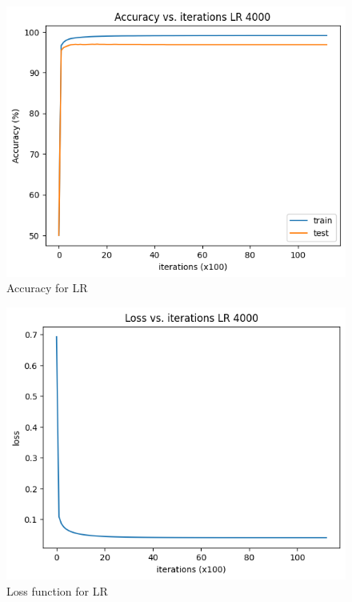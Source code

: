 \documentclass{article}
\begin{document}
\begin{multicols}{2}
    \begin{figure}[H]
        \centering
        \includegraphics[width=0.9\columnwidth]{Figures/ACC_lr_deep.png}
        \caption{\footnotesize Accuracy for LR}
        \label{fig:ACC_lr_deep}
    \end{figure}

    \begin{figure}[H]
        \centering
        \includegraphics[width=0.9\columnwidth]{Figures/LOSS_lr_deep.png}
        \caption{\footnotesize Loss function for LR }
        \label{LOSS_lr_deep}
    \end{figure}




\end{multicols}
\end{document}
